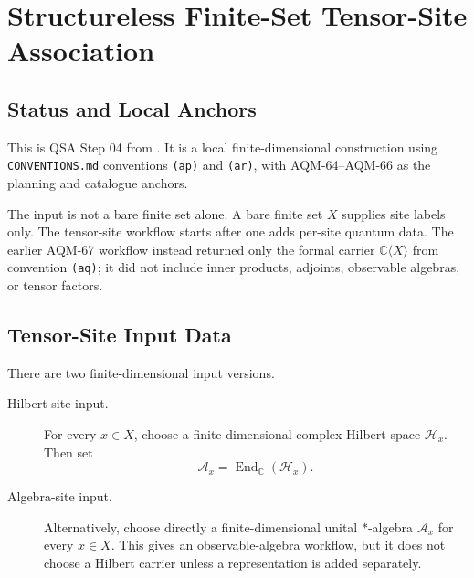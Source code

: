 
\section{Structureless Finite-Set Tensor-Site Association}
\label{sec:qsa-finite-set-tensor-sites}

\subsection{Status and Local Anchors}

This is QSA Step 04 from
.  It is a local
finite-dimensional construction using \texttt{CONVENTIONS.md} conventions
\texttt{(ap)} and \texttt{(ar)}, with AQM-64--AQM-66 as the planning and
catalogue anchors.

The input is not a bare finite set alone.  A bare finite set \(X\) supplies
site labels only.  The tensor-site workflow starts after one adds per-site
quantum data.  The earlier AQM-67 workflow instead returned only the formal
carrier \(\mathbb C\langle X\rangle\) from convention \texttt{(aq)}; it did
not include inner products, adjoints, observable algebras, or tensor factors.

\subsection{Tensor-Site Input Data}

There are two finite-dimensional input versions.

\begin{description}
\item[Hilbert-site input.]
For every \(x\in X\), choose a finite-dimensional complex Hilbert space
\(\mathcal H_x\).  Then set
\[
  \mathcal A_x=\operatorname{End}_{\mathbb C}(\mathcal H_x).
\]

\item[Algebra-site input.]
Alternatively, choose directly a finite-dimensional unital \(*\)-algebra
\(\mathcal A_x\) for every \(x\in X\).  This gives an observable-algebra
workflow, but it does not choose a Hilbert carrier unless a representation is
added separately.
\end{description}

